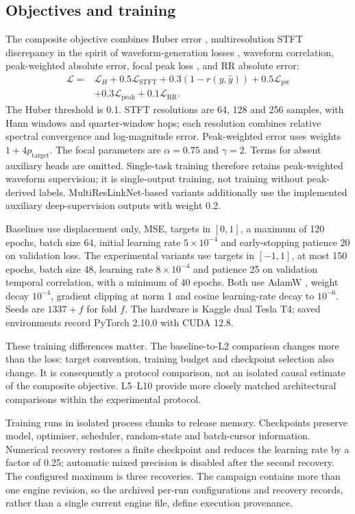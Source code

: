 \documentclass[11pt,a4paper]{article}
\begin{document}
\subsection{Objectives and training}

The composite objective combines Huber error \citep{huber}, multiresolution STFT discrepancy
in the spirit of waveform-generation losses \citep{wavegan}, waveform correlation,
peak-weighted absolute error, focal peak loss \citep{focal}, and RR absolute error:
\begin{align}
\mathcal L={}&\mathcal L_H+0.5\mathcal L_{\mathrm{STFT}}+
0.3(1-r(y,\hat y))+0.5\mathcal L_{\mathrm{pw}}\nonumber\\
&+0.3\mathcal L_{\mathrm{peak}}+0.1\mathcal L_{\mathrm{RR}}.
\label{eq:loss}
\end{align}
The Huber threshold is 0.1. STFT resolutions are 64, 128 and 256 samples, with Hann windows
and quarter-window hops; each resolution combines relative spectral convergence and
log-magnitude error. Peak-weighted error uses weights $1+4p_{\mathrm{target}}$.
The focal parameters are $\alpha=0.75$ and $\gamma=2$. Terms for absent auxiliary heads are
omitted. Single-task training therefore retains peak-weighted waveform supervision; it is
single-output training, not training without peak-derived labels. MultiResLinkNet-based
variants additionally use the implemented auxiliary deep-supervision outputs with weight 0.2.

Baselines use displacement only, MSE, targets in $[0,1]$, a maximum of 120 epochs, batch size
64, initial learning rate $5\times10^{-4}$ and early-stopping patience 20 on validation loss.
The experimental variants use targets in $[-1,1]$, at most 150 epochs, batch size 48,
learning rate $8\times10^{-4}$ and patience 25 on validation temporal correlation, with a
minimum of 40 epochs. Both use AdamW \citep{adamw}, weight decay $10^{-4}$, gradient clipping
at norm 1 and cosine learning-rate decay to $10^{-6}$. Seeds are $1337+f$ for fold $f$.
The hardware is Kaggle dual Tesla T4; saved environments record PyTorch 2.10.0 with CUDA 12.8.

These training differences matter. The baseline-to-L2 comparison changes more than the loss:
target convention, training budget and checkpoint selection also change. It is consequently
a protocol comparison, not an isolated causal estimate of the composite objective. L5--L10
provide more closely matched architectural comparisons within the experimental protocol.

Training runs in isolated process chunks to release memory. Checkpoints preserve model,
optimiser, scheduler, random-state and batch-cursor information. Numerical recovery restores
a finite checkpoint and reduces the learning rate by a factor of 0.25; automatic mixed
precision is disabled after the second recovery. The configured maximum is three recoveries.
The campaign contains more than one engine revision, so the archived per-run configurations
and recovery records, rather than a single current engine file, define execution provenance.
\end{document}

